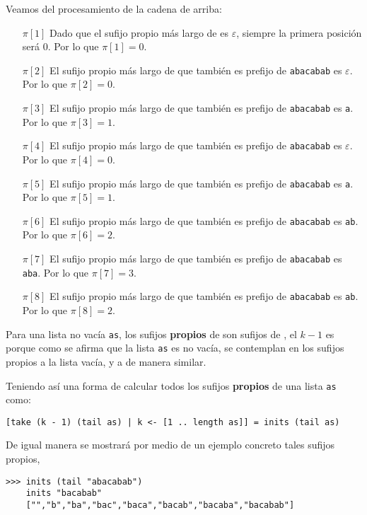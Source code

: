 Veamos del procesamiento de la cadena de arriba:
\begin{itemize}
\item[$\pi{[1]}$] Dado que el sufijo propio más largo de  es
$\varepsilon$, siempre la primera posición será 0. Por lo que $\pi[1] = 0$.
\item[$\pi{[2]}$] El sufijo propio más largo de  que también es
prefijo de \texttt{abacabab} es $\varepsilon$. Por lo que $\pi[2] = 0$.
\item[$\pi{[3]}$] El sufijo propio más largo de  que también es
prefijo de \texttt{abacabab} es \texttt{a}. Por lo que $\pi[3] = 1$.
\item[$\pi{[4]}$] El sufijo propio más largo de  que también es
prefijo de \texttt{abacabab} es $\varepsilon$. Por lo que $\pi[4] = 0$.
\item[$\pi{[5]}$] El sufijo propio más largo de  que también
es prefijo de \texttt{abacabab} es \texttt{a}. Por lo que $\pi[5] = 1$.
\item[$\pi{[6]}$] El sufijo propio más largo de  que también
es prefijo de \texttt{abacabab} es \texttt{ab}. Por lo que $\pi[6] = 2$.
\item[$\pi{[7]}$] El sufijo propio más largo de  que también
es prefijo de \texttt{abacabab} es \texttt{aba}. Por lo que $\pi[7] = 3$.
\item[$\pi{[8]}$] El sufijo propio más largo de  que también
es prefijo de \texttt{abacabab} es \texttt{ab}. Por lo que $\pi[8] = 2$.
\end{itemize}

Para una lista no vacía \texttt{as}, los sufijos \textbf{propios} de  son sufijos
de , el $k-1$ es porque como se afirma que la lista \texttt{as} es no
vacía, se contemplan en los sufijos propios a la lista vacía, y a  de manera
similar.

Teniendo así una forma de calcular todos los sufijos \textbf{propios} de una lista \texttt{as} como:
\begin{verbatim}
[take (k - 1) (tail as) | k <- [1 .. length as]] = inits (tail as)
\end{verbatim}

De igual manera se mostrará por medio de un ejemplo concreto tales sufijos propios,
\begin{verbatim}
>>> inits (tail "abacabab")
    inits "bacabab"
    ["","b","ba","bac","baca","bacab","bacaba","bacabab"]
\end{verbatim}

